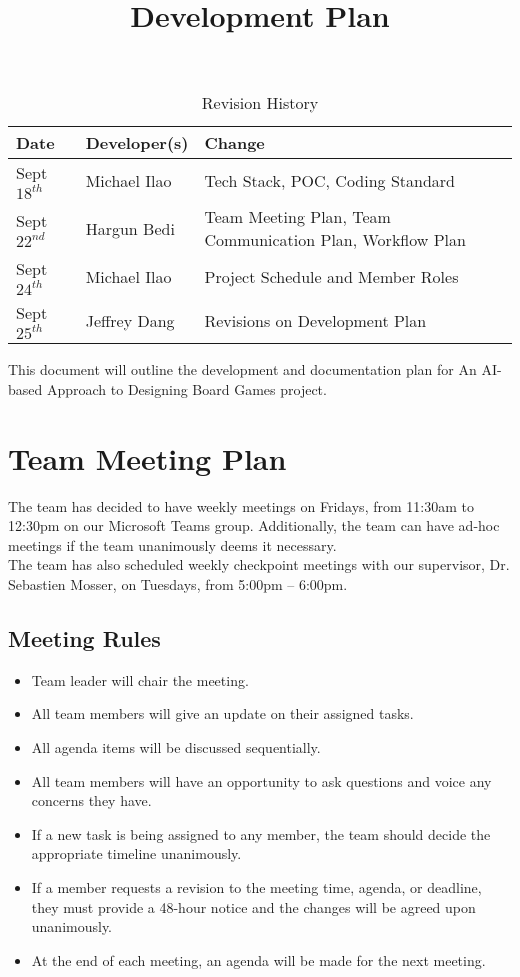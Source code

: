 \documentclass{article}
\title{Development Plan\\\progname}
\author{\authname}
\date{}
\begin{document}
\begin{table}[hp]
\caption{Revision History} \label{TblRevisionHistory}
\begin{tabularx}{\textwidth}{llX}
\toprule
\textbf{Date} & \textbf{Developer(s)} & \textbf{Change}\\
\midrule
Sept $18^{th}$ & Michael Ilao & Tech Stack, POC, Coding Standard\\
Sept $22^{nd}$ & Hargun Bedi & Team Meeting Plan, Team Communication Plan, Workflow Plan\\
Sept $24^{th}$ & Michael Ilao & Project Schedule and Member Roles\\
Sept $25^{th}$ & Jeffrey Dang & Revisions on Development Plan\\
\bottomrule
\end{tabularx}
\end{table}

\newpage

\maketitle

This document will outline the development and documentation plan for An AI-based Approach to Designing Board Games project.
\section{Team Meeting Plan}
The team has decided to have weekly meetings on Fridays, from 11:30am to 12:30pm on our Microsoft Teams group. Additionally, the team can have ad-hoc meetings if the team unanimously deems it necessary. 
\\The team has also scheduled weekly checkpoint meetings with our supervisor, Dr. Sebastien Mosser, on Tuesdays, from 5:00pm – 6:00pm. 
\subsection{Meeting Rules}
\begin{itemize}
    \item Team leader will chair the meeting.
    \item All team members will give an update on their assigned tasks.
    \item All agenda items will be discussed sequentially.
    \item All team members will have an opportunity to ask questions and voice any concerns they have.
    \item If a new task is being assigned to any member, the team should decide the appropriate timeline unanimously. 
    \item If a member requests a revision to the meeting time, agenda, or deadline, they must provide a 48-hour notice and the changes will be agreed upon unanimously.
    \item At the end of each meeting, an agenda will be made for the next meeting. 
\end{itemize}
\end{document}
